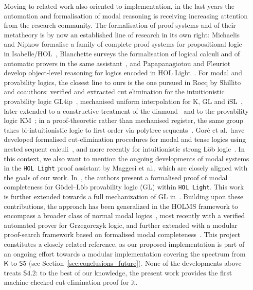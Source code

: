 \documentclass{article}
\newcommand{\logic}{\mathsf{S4.2}}
\newcommand{\axname}[1]{\mathsf{#1}}
\theoremstyle{definition}
\begin{document}
Moving to related work also oriented to implementation, in the last years the automation and formalisation of modal reasoning is receiving increasing attention from the research community.
The formalisation of proof systems and of their metatheory is by now an established line of research in its own right: Michaelis and Nipkow formalise a family of complete proof systems for propositional logic in Isabelle/HOL~\cite{Michaelis2019:FormalizedProofSystems}, Blanchette surveys the formalisation of logical calculi and of automatic provers in the same assistant~\cite{Blanchette2019:MetatheoryIsabelle}, and Papapanagiotou and Fleuriot develop object-level reasoning for logics encoded in HOL Light~\cite{Papapanagiotou2021:ObjectLevelHOLLight}.
For modal and provability logics, the closest line to ours is the one pursued in Rocq by Shillito and coauthors: verified and extracted cut elimination for the intuitionistic provability logic GL4ip~\cite{Gore2022:AdditiveCutsGL4ip}, mechanised uniform interpolation for \textsf{K}, \textsf{GL} and \textsf{iSL}~\cite{Feree2024:MechanisedUniformInterp}, later extended to a constructive treatment of the diamond~\cite{vanderGiessen2026:ConstructiveDiamond} and to the provability logic \textsf{KM}~\cite{Feree2026:UniformInterpolationKM}; in a proof-theoretic rather than mechanised register, the same group takes bi-intuitionistic logic to first order via polytree sequents~\cite{Lyon2025:PolytreeSequents}.
Gor\'{e} et al.\ have developed formalised cut-elimination procedures for modal and tense logics using nested sequent calculi~\cite{Gore2021:FormalVerifiedLinearNested,Gore2021:CutElimProvabilityCoq}, and more recently for intuitionistic strong L\"{o}b logic~\cite{Gore23}.
In this context, we also want to mention the ongoing developments of modal systems in the \texttt{HOL Light} proof assistant by Maggesi et al., which are closely aligned with the goals of our work.
In~\cite{Maggesi2021:ProvabilityLogic}, the authors present a formalised proof of modal completeness for G\"odel–L\"ob provability logic (GL) within \texttt{HOL Light}.
This work is further extended towards a full mechanization of GL in~\cite{Maggesi2023:GodelLob}.
Building upon these contributions, the approach has been generalized in the \textsf{HOLMS} framework to encompass a broader class of normal modal logics~\cite{Bilotta2024:GrowingHOLMS,Bilotta2026:GrzegorczykHOLMS}, most recently with a verified automated prover for Grzegorczyk logic, and further extended with a modular proof-search framework based on formalised modal completeness~\cite{Bilotta2026:ModularHOLMS}.
This project constitutes a closely related reference, as our proposed implementation is part of an ongoing effort towards a modular implementation covering the spectrum from $\mathsf{K}$ to $\axname{S}5$ (see Section~\ref{sec:conclusions_future}). None of the developments above treats $\logic$: to the best of our knowledge, the present work provides the first machine-checked cut-elimination proof for it.
\end{document}
